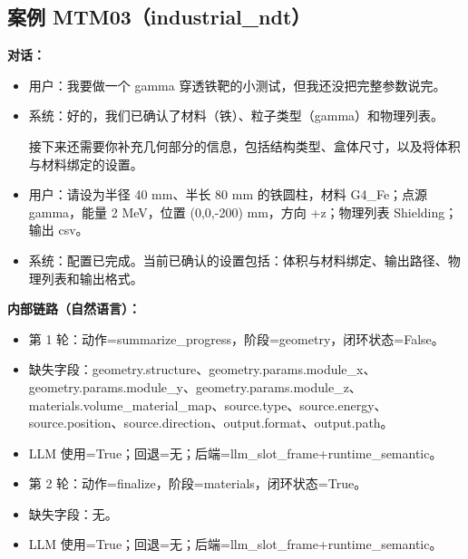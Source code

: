 \documentclass[11pt]{ctexart}
\begin{document}
\subsection{案例 MTM03（industrial\_ndt）}
\textbf{对话：}
\begin{itemize}
\item 用户：我要做一个 gamma 穿透铁靶的小测试，但我还没把完整参数说完。
\item 系统：好的，我们已确认了材料（铁）、粒子类型（gamma）和物理列表。

接下来还需要你补充几何部分的信息，包括结构类型、盒体尺寸，以及将体积与材料绑定的设置。
\item 用户：请设为半径 40 mm、半长 80 mm 的铁圆柱，材料 G4\_Fe；点源 gamma，能量 2 MeV，位置 (0,0,-200) mm，方向 +z；物理列表 Shielding；输出 csv。
\item 系统：配置已完成。当前已确认的设置包括：体积与材料绑定、输出路径、物理列表和输出格式。
\end{itemize}
\textbf{内部链路（自然语言）：}
\begin{itemize}
\item 第 1 轮：动作=summarize\_progress，阶段=geometry，闭环状态=False。
\item 缺失字段：geometry.structure、geometry.params.module\_x、geometry.params.module\_y、geometry.params.module\_z、materials.volume\_material\_map、source.type、source.energy、source.position、source.direction、output.format、output.path。
\item LLM 使用=True；回退=无；后端=llm\_slot\_frame+runtime\_semantic。
\item 第 2 轮：动作=finalize，阶段=materials，闭环状态=True。
\item 缺失字段：无。
\item LLM 使用=True；回退=无；后端=llm\_slot\_frame+runtime\_semantic。
\end{itemize}
\end{document}
